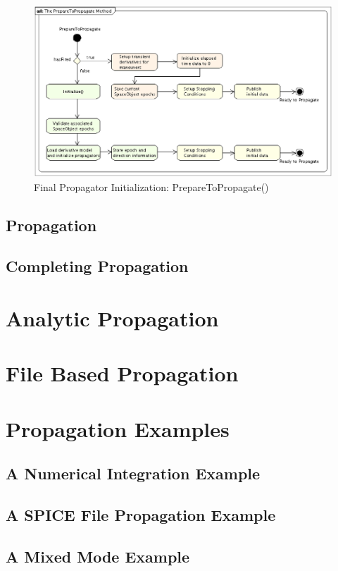 \begin{figure}[htb]
\begin{center}
\includegraphics[scale=0.5]{Images/ThePrepareToPropagateMethod.eps}
\caption[Final Propagator Initialization:PrepareToPropagate())]
{\label{figure:PrepareToPropagate}Final Propagator Initialization:
PrepareToPropagate()}
\end{center}
\end{figure}


\subsection{Propagation}



\subsection{Completing Propagation}


\section{Analytic Propagation}

\section{File Based Propagation}

\section{Propagation Examples}

\subsection{\label{section:IntegratorExample}A Numerical Integration Example}

\subsection{\label{section:SpiceExample}A SPICE File Propagation Example}

\subsection{\label{section:MixedModePropagation}A Mixed Mode Example}

